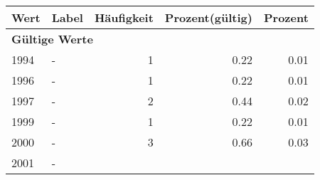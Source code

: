     \begin{longtable}{lXrrr}
     \toprule
     \textbf{Wert} & \textbf{Label} & \textbf{Häufigkeit} & \textbf{Prozent(gültig)} & \textbf{Prozent} \\
     \endhead
     \midrule
     \multicolumn{5}{l}{\textbf{Gültige Werte}}\\

     1994 &
     \multicolumn{1}{X}{ -  } &


       \num{1} &
       \num[round-mode=places,round-precision=2]{0.22} &
         \num[round-mode=places,round-precision=2]{0.01} \\

     1996 &
     \multicolumn{1}{X}{ -  } &


       \num{1} &
       \num[round-mode=places,round-precision=2]{0.22} &
         \num[round-mode=places,round-precision=2]{0.01} \\

     1997 &
     \multicolumn{1}{X}{ -  } &


       \num{2} &
       \num[round-mode=places,round-precision=2]{0.44} &
         \num[round-mode=places,round-precision=2]{0.02} \\

     1999 &
     \multicolumn{1}{X}{ -  } &


       \num{1} &
       \num[round-mode=places,round-precision=2]{0.22} &
         \num[round-mode=places,round-precision=2]{0.01} \\

     2000 &
     \multicolumn{1}{X}{ -  } &


       \num{3} &
       \num[round-mode=places,round-precision=2]{0.66} &
         \num[round-mode=places,round-precision=2]{0.03} \\

     2001 &
     \multicolumn{1}{X}{ -  } &



\end{longtable}
